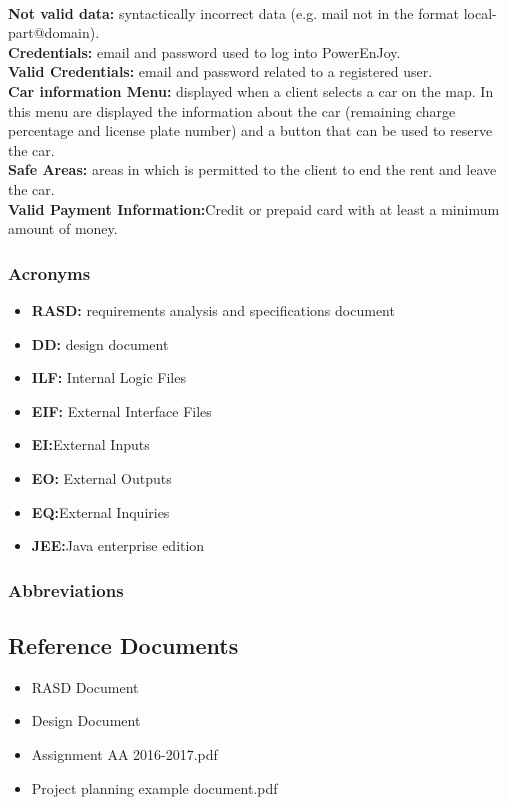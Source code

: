 \emph{\\}
\textbf{Not valid data:}
syntactically incorrect data (e.g. mail not in the format local-part@domain).\\
\textbf{Credentials:}
email and password used to log into PowerEnJoy.\\
\textbf{Valid Credentials:}
email and password related to a registered user.\\
\textbf{Car information Menu:}
displayed when a client selects a car on the map. In this menu are displayed the information about the car (remaining charge percentage and license plate number) and a button that can be used to reserve the car.\\
\textbf{Safe Areas:} 
areas in which is permitted to the client to end the rent and leave the car.\\
\textbf{Valid Payment Information:}Credit or prepaid card with at least a minimum amount of money.\\



\subsubsection{Acronyms}
\begin{itemize}
\item \textbf{RASD:} requirements analysis and specifications document
\item \textbf{DD:} design document
\item \textbf{ILF:} Internal Logic Files
\item \textbf{EIF:} External Interface Files
\item \textbf{EI:}External Inputs
\item \textbf{EO:} External Outputs
\item \textbf{EQ:}External Inquiries
\item \textbf{JEE:}Java enterprise edition

\end{itemize}	




\subsubsection{Abbreviations}






\subsection{Reference Documents}

\begin{itemize}
\item RASD Document
\item Design Document
\item Assignment AA 2016-2017.pdf
\item Project planning example document.pdf
\end{itemize}








